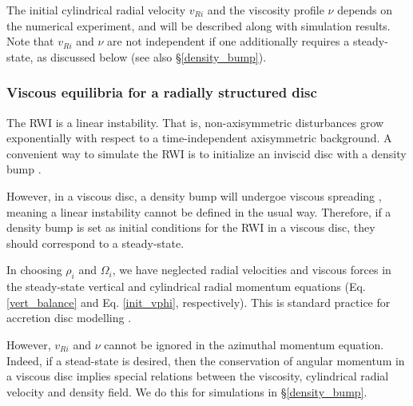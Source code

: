 The initial cylindrical radial velocity $v_{Ri}$ and the viscosity
profile $\nu$ depends on the numerical experiment, and will be
described along with simulation results. Note that $v_{Ri}$ and $\nu$
are not independent if one additionally requires a steady-state, as
discussed below (see also \S\ref{density_bump}).   

\subsubsection{Viscous equilibria for a radially structured
  disc}\label{visc_eq} 
The RWI is a linear instability. That is, non-axisymmetric
disturbances grow exponentially with respect to a time-independent
axisymmetric background. A convenient way to simulate the RWI is to
initialize an inviscid disc with a density bump \citep{li00}. 

However, in a viscous disc, a density bump will undergoe viscous
spreading \citep{lyndenbell74}, meaning a linear instability cannot be
defined in the usual way. 
Therefore, if a density bump is set as initial conditions for the RWI
in a viscous disc, they should correspond to a
steady-state. 

In choosing $\rho_i$ and $\Omega_i$, we have neglected radial
velocities and viscous forces in the steady-state vertical and
cylindrical radial momentum equations (Eq. \ref{vert_balance} and
Eq. \ref{init_vphi}, respectively). This is standard practice for
accretion disc modelling \citep[e.g.][]{takeuchi02}.   

However, $v_{Ri}$ and $\nu$ cannot be ignored in the azimuthal
momentum equation. Indeed, if a stead-state is desired, then the
conservation of angular momentum in a viscous disc implies special
relations between the viscosity, cylindrical radial velocity and
density field. We do this for simulations in \S\ref{density_bump}.   


